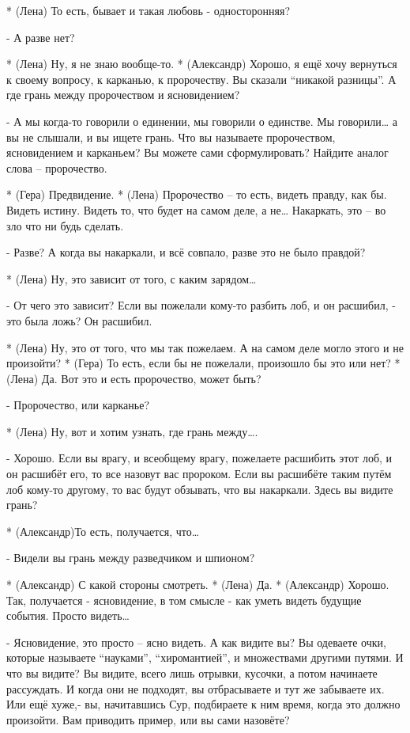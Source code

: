 * (Лена) То есть, бывает и такая любовь - односторонняя?

- А разве нет?

* (Лена) Ну, я не знаю вообще-то.
* (Александр) Хорошо, я ещё хочу вернуться к своему вопросу, к карканью, к пророчеству. Вы сказали “никакой разницы”. А где грань между пророчеством и ясновидением?

- А мы когда-то говорили о единении, мы говорили о единстве. Мы говорили… а вы не слышали, и вы ищете грань. Что вы называете пророчеством, ясновидением и карканьем? Вы можете сами сформулировать? Найдите аналог слова – пророчество.

* (Гера) Предвидение.
* (Лена) Пророчество – то есть, видеть правду, как бы. Видеть истину. Видеть то, что будет на самом деле, а не… Накаркать, это – во зло что ни будь сделать.

- Разве? А когда вы накаркали, и всё совпало, разве это не было правдой?

* (Лена) Ну, это зависит от того, с каким зарядом…

- От чего это зависит? Если вы пожелали кому-то разбить лоб, и он расшибил, - это была ложь? Он расшибил.

* (Лена) Ну, это от того, что мы так пожелаем. А на самом деле могло этого и не произойти?
* (Гера) То есть, если бы не пожелали, произошло бы это или нет?
* (Лена) Да. Вот это и есть пророчество, может быть?

- Пророчество, или карканье?

* (Лена) Ну, вот и хотим узнать, где грань между….

- Хорошо. Если вы врагу, и всеобщему врагу, пожелаете расшибить этот лоб, и он расшибёт его, то все назовут вас пророком. Если вы расшибёте таким путём лоб кому-то другому, то вас будут обзывать, что вы накаркали. Здесь вы видите грань?

* (Александр)То есть, получается, что…

- Видели вы грань между разведчиком и шпионом?

* (Александр) С какой стороны смотреть.
* (Лена) Да.  
* (Александр) Хорошо. Так, получается - ясновидение, в том смысле - как уметь видеть будущие события. Просто видеть…

- Ясновидение, это просто – ясно видеть.  А как видите вы? Вы одеваете очки, которые называете “науками”, “хиромантией”, и множествами другими путями. И что вы видите? Вы видите, всего лишь отрывки, кусочки, а потом начинаете рассуждать. И когда они не подходят, вы отбрасываете и тут же забываете их. Или ещё хуже,- вы, начитавшись Сур, подбираете к ним время, когда это должно произойти. Вам приводить пример, или вы сами назовёте?

